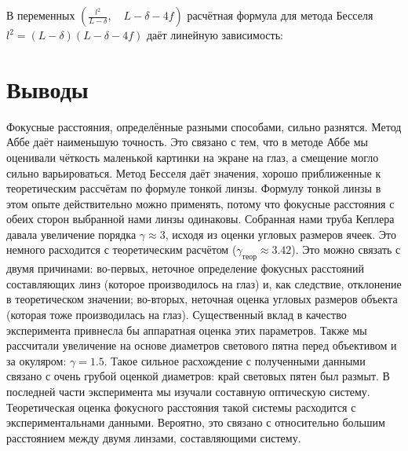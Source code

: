 \n
В переменных $(\frac{l^2}{L - \delta}, \quad L - \delta - 4f)$ расчётная формула для метода Бесселя $l^2 = (L - \delta) (L - \delta - 4f)$ даёт линейную зависимость:


\section*{Выводы}
Фокусные расстояния, определённые разными способами, сильно разнятся. Метод Аббе даёт наименьшую точность. Это связано с тем, что в методе Аббе мы оценивали чёткость маленькой картинки на экране на глаз, а смещение могло сильно варьироваться. Метод Бесселя даёт значения, хорошо приближенные к теоретическим рассчётам по формуле тонкой линзы. Формулу тонкой линзы в этом опыте действительно можно применять, потому что фокусные расстояния с обеих сторон выбранной нами линзы одинаковы.\n\n
Собранная нами труба Кеплера давала увеличение порядка $\gamma \approx 3$, исходя из оценки угловых размеров ячеек. Это немного расходится с теоретическим расчётом ($\gamma_{\text{теор}} \approx 3.42$). Это можно связать с двумя причинами: во-первых, неточное определение фокусных расстояний составляющих линз (которое производилось на глаз) и, как следствие, отклонение в теоретическом значении; во-вторых, неточная оценка угловых размеров объекта (которая тоже производилась на глаз). Существенный вклад в качество эксперимента привнесла бы аппаратная оценка этих параметров. Также мы рассчитали увеличение на основе диаметров светового пятна перед объективом и за окуляром: $\gamma = 1.5$. Такое сильное расхождение с полученными данными связано с очень грубой оценкой диаметров: край световых пятен был размыт.\n\n
В последней части эксперимента мы изучали составную оптическую систему. Теоретическая оценка фокусного расстояния такой системы расходится с экспериментальнами данными. Вероятно, это связано с относительно большим расстоянием между двумя линзами, составляющими систему.


